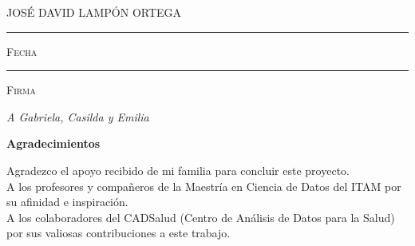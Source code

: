 \documentclass[11pt, oneside]{book}
\begin{document}
\centering
\vspace{5em}
\hspace{3em}

\textsc{JOSÉ DAVID LAMPÓN ORTEGA}

\vspace{5em}

\rule[1em]{20em}{0.5pt} %

\textsc{Fecha}
 
\vspace{8em}

\rule[1em]{20em}{0.5pt} %

\textsc{Firma}

\endgroup
\vspace*{\fill}



\pagestyle{empty}
\frontmatter
\pagestyle{plain}

\vspace{5em}
\begin{flushright}
\textit{A Gabriela, Casilda y Emilia}
\end{flushright}


\newpage
\pagestyle{empty}

{\Large \textbf{Agradecimientos}}\\
\pagestyle{plain}

Agradezco el apoyo recibido de mi familia para concluir este proyecto.\\

A los profesores y compañeros de la Maestría en Ciencia de Datos del ITAM por su afinidad e inspiración.\\

A los colaboradores del CADSalud (Centro de Análisis de Datos para la Salud) por sus valiosas contribuciones a este trabajo.\\



\newpage
\end{document}
